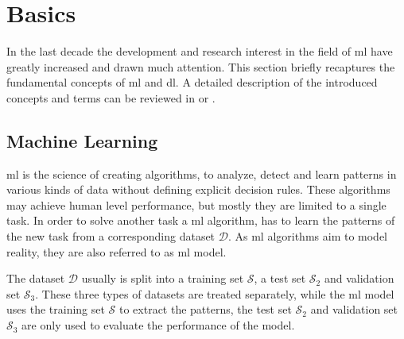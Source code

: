 
\section{Basics}\label{ord:ch2:sec1}

In the last decade the development and research interest in the field of \gls{ml} have greatly increased and drawn much attention. 
This section briefly recaptures the fundamental concepts of \gls{ml} and \gls{dl}.
A detailed description of the introduced concepts and terms can be reviewed in \cite{Ger17-HandsOn} or \cite{Goodfellow-et-al-2016}.


\subsection{Machine Learning}\label{ord:ch2:sec1:subsec1}

\gls{ml} is the science of creating algorithms, to analyze, detect and learn patterns in various kinds of data without defining explicit decision rules.
These algorithms may achieve human level performance, but mostly they are limited to a single task.
In order to solve another task a \gls{ml} algorithm, has to learn the patterns of the new task from a corresponding dataset $\mathcal{D}$.
As \gls{ml} algorithms aim to model reality, they are also referred to as \gls{ml} model.

The dataset $\mathcal{D}$ usually is split into a training set $\mathcal{S}$, a test set $\mathcal{S}_2$ and validation set $\mathcal{S}_3$.
These three types of datasets are treated separately, while the \gls{ml} model uses the training set $\mathcal{S}$ to extract the patterns, the test set $\mathcal{S}_2$ and validation set $\mathcal{S}_3$ are only used to evaluate the performance of the model.

